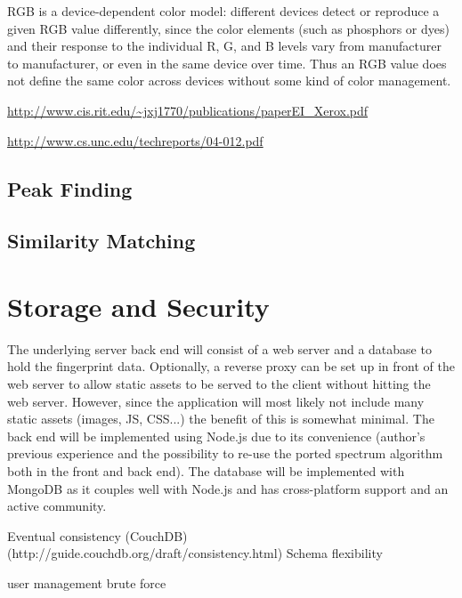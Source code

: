 \documentclass[thesis.tex]{subfiles}
\begin{document}
RGB is a device-dependent color model: different devices detect or reproduce a given RGB value differently, since the color elements (such as phosphors or dyes) and their response to the individual R, G, and B levels vary from manufacturer to manufacturer, or even in the same device over time. Thus an RGB value does not define the same color across devices without some kind of color management.

\url{http://www.cis.rit.edu/~jxj1770/publications/paperEI_Xerox.pdf}

\url{http://www.cs.unc.edu/techreports/04-012.pdf}

\subsection{Peak Finding}

\subsection{Similarity Matching}

\section{Storage and Security}
\label{chapter:storage-security}

The underlying server back end will consist of a web server and a database to hold the fingerprint data. Optionally, a reverse proxy can be set up in front of the web server to allow static assets to be served to the client without hitting the web server. However, since the application will most likely not include many static assets (images, JS, CSS...) the benefit of this is somewhat minimal. The back end will be implemented using Node.js due to its convenience (author's previous experience and the possibility to re-use the ported spectrum algorithm both in the front and back end). The database will be implemented with MongoDB as it couples well with Node.js and has cross-platform support and an active community.

Eventual consistency (CouchDB) (http://guide.couchdb.org/draft/consistency.html)
Schema flexibility

user management brute force
\end{document}
